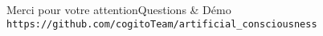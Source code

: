 \begin{frame}{Merci pour votre attention}{Questions \& Démo}
\texttt{https://github.com/cogitoTeam/artificial\_consciousness}
\end{frame}